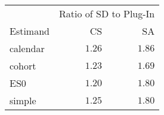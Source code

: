 \captionsetup[table]{labelformat=empty,skip=1pt}
\begin{longtable}{lrr}
\toprule
 & \multicolumn{2}{c}{Ratio of SD to Plug-In} \\ 
 \cmidrule(lr){2-3}
Estimand & CS & SA \\ 
\midrule
calendar & $1.26$ & $1.86$ \\ 
cohort & $1.23$ & $1.69$ \\ 
ES0 & $1.20$ & $1.80$ \\ 
simple & $1.25$ & $1.80$ \\ 
 \bottomrule
\end{longtable}

